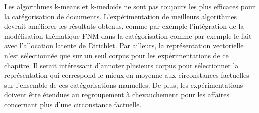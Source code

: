 Les algorithmes k-means et k-medoids ne sont pas toujours les plus efficaces pour la catégorisation de documents. L'expérimentation de meilleurs algorithmes devrait améliorer les résultats obtenus, comme par exemple l'intégration de la modélisation thématique FNM dans la catégorisation comme par exemple \citet{xie2013MGCTM} le fait avec l'allocation latente de Dirichlet. Par ailleurs, la représentation vectorielle n'est sélectionnée que sur un seul corpus pour les expérimentations de ce chapitre. Il serait intéressant d'annoter plusieurs corpus pour sélectionner la représentation qui correspond le mieux en moyenne aux circonstances factuelles sur l'ensemble de ces catégorisations manuelles. De plus, les expérimentations doivent être étendues au regroupement à chevauchement pour les affaires  concernant plus d'une circonstance factuelle.